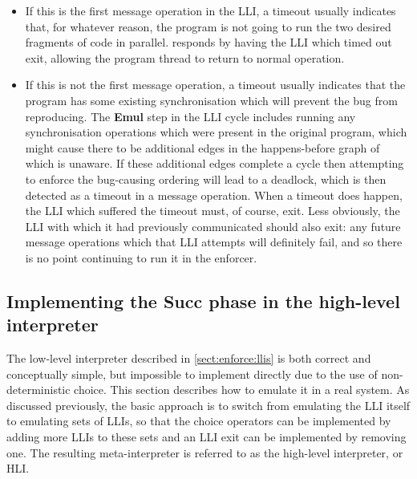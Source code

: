 \begin{itemize}
\item
  If this is the first message operation in the LLI, a timeout usually
  indicates that, for whatever reason, the program is not going to run
  the two desired fragments of code in parallel.  {\Technique}
  responds by having the LLI which timed out exit, allowing the
  program thread to return to normal operation.

\item
  If this is not the first message operation, a timeout usually
  indicates that the program has some existing synchronisation which
  will prevent the bug from reproducing.  The \textbf{Emul} step in
  the LLI cycle includes running any synchronisation operations which
  were present in the original program, which might cause there to be
  additional edges in the happens-before graph of which {\technique}
  is unaware.  If these additional edges complete a cycle then
  attempting to enforce the bug-causing ordering will lead to a
  deadlock, which is then detected as a timeout in a message
  operation.  When a timeout does happen, the LLI which suffered the
  timeout must, of course, exit.  Less obviously, the LLI with which
  it had previously communicated should also exit: any future message
  operations which that LLI attempts will definitely fail, and so
  there is no point continuing to run it in the enforcer.
\end{itemize}


\subsection{Implementing the \textbf{Succ} phase in the high-level interpreter}
\label{sect:enforce:succ}

The low-level interpreter described in \autoref{sect:enforce:llis}
is both correct and conceptually simple, but impossible to implement
directly due to the use of non-deterministic choice.  This section
describes how to emulate it in a real system.  As discussed
previously, the basic approach is to switch from emulating the LLI
itself to emulating sets of LLIs, so that the choice operators can be
implemented by adding more LLIs to these sets and an LLI exit can be
implemented by removing one.  The resulting meta-interpreter is
referred to as the high-level interpreter, or HLI.

